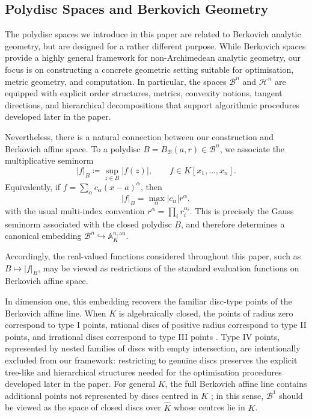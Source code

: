 \documentclass[10pt]{article}
\theoremstyle{definition}
\newcommand{\BA}{\mathbb{A}}
\begin{document}
\subsection{Polydisc Spaces and Berkovich Geometry}\label{sec:Berkovich}

The polydisc spaces we introduce in this paper are related to Berkovich analytic geometry, but are designed for a rather different purpose. While Berkovich spaces provide a highly general framework for non-Archimedean analytic geometry, our focus is on constructing a concrete geometric setting suitable for optimisation, metric geometry, and computation. In particular, the spaces $\mathcal B^n$ and $\mathcal H^n$ are equipped with explicit order structures, metrics, convexity notions, tangent directions, and hierarchical decompositions that support algorithmic procedures developed later in the paper.

Nevertheless, there is a natural connection between our construction and Berkovich affine space. To a polydisc \(B=B_{\mathcal{B}}(a,r)\in\mathcal B^n\), we associate the multiplicative seminorm
\[
  |f|_B \coloneqq \sup_{z\in B}|f(z)|,\qquad f\in K[x_1,\dots,x_n].
\]
Equivalently, if $f=\sum_\alpha c_\alpha (x-a)^\alpha$, then
\[
  |f|_B=\max_\alpha |c_\alpha| r^\alpha,
\]
with the usual multi-index convention $r^\alpha=\prod_i r_i^{\alpha_i}$. This is precisely the Gauss seminorm associated with the closed polydisc \(B\), and therefore determines a canonical embedding
\(
  \mathcal B^n \hookrightarrow \BA_K^{n,\mathrm{an}}.
\)

Accordingly, the real-valued functions considered throughout this paper, such as $B \mapsto |f|_B$, may be viewed as restrictions of the standard evaluation functions on Berkovich affine space.


In dimension one, this embedding recovers the familiar disc-type points of the Berkovich affine line. When $K$ is algebraically closed, the points of radius zero correspond to type I points, rational discs of positive radius correspond to type II points, and irrational discs correspond to type III points \cite{baker2008introduction,BakerRumely2010}. Type IV points, represented by nested families of discs with empty intersection, are intentionally excluded from our framework: restricting to genuine discs preserves the explicit tree-like and hierarchical structures needed for the optimisation procedures developed later in the paper. For general $K$, the full Berkovich affine line contains additional points not represented by discs centred in $K$ \cite[Corollary I.5.6]{poineau2021berkovich}; in this sense, $\mathcal B^1$ should be viewed as the space of closed discs over $\widehat K$ whose centres lie in $K$.
\end{document}

